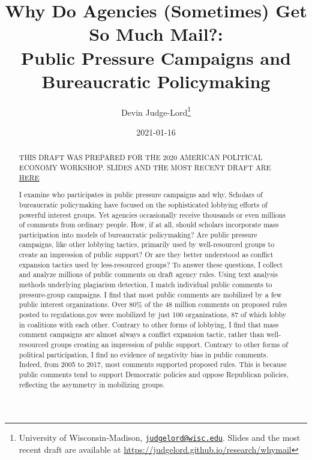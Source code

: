 \documentclass[
      12pt,
        ]{article}
\title{Why Do Agencies (Sometimes) Get So Much Mail?: 
           \\ Public Pressure Campaigns and Bureaucratic Policymaking}
\author{ %
            Devin Judge-Lord\footnote{University of Wisconsin-Madison, \href{mailto:judgelord@wisc.edu}{\nolinkurl{judgelord@wisc.edu}}. Slides and the most recent draft are available at \url{https://judgelord.github.io/research/whymail}} 
            }
\date{2021-01-16}
\begin{document}
 


  \maketitle




  \begin{abstract}
    \noindent THIS DRAFT WAS PREPARED FOR THE 2020 AMERICAN POLITICAL ECONOMY WORKSHOP. SLIDES AND THE MOST RECENT DRAFT ARE \href{https://judgelord.github.io/research/whymail/}{HERE}

\bigskip

I examine who participates in public pressure campaigns and why. Scholars of bureaucratic policymaking have focused on the sophisticated lobbying efforts of powerful interest groups. Yet agencies occasionally receive thousands or even millions of comments from ordinary people. How, if at all, should scholars incorporate mass participation into models of bureaucratic policymaking? Are public pressure campaigns, like other lobbying tactics, primarily used by well-resourced groups to create an impression of public support? Or are they better understood as conflict expansion tactics used by less-resourced groups? To answer these questions, I collect and analyze millions of public comments on draft agency rules. Using text analysis methods underlying plagiarism detection, I match individual public comments to pressure-group campaigns. I find that most public comments are mobilized by a few public interest organizations. Over 80\% of the 48 million comments on proposed rules posted to regulations.gov were mobilized by just 100 organizations, 87 of which lobby in coalitions with each other. Contrary to other forms of lobbying, I find that mass comment campaigns are almost always a conflict expansion tactic, rather than well-resourced groups creating an impression of public support. Contrary to other forms of political participation, I find no evidence of negativity bias in public comments. Indeed, from 2005 to 2017, most comments supported proposed rules. This is because public comments tend to support Democratic policies and oppose Republican policies, reflecting the asymmetry in mobilizing groups. 

    

  \end{abstract}
\end{document}
